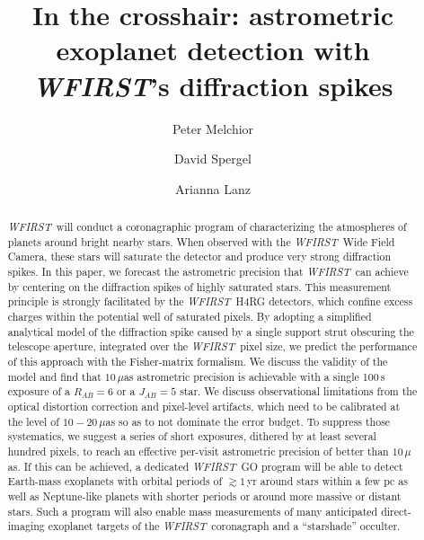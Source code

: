 \documentclass[modern, times]{aastex61}
\newcommand\wfirst{\textit{WFIRST}}
\begin{document}
\title{In the crosshair: astrometric exoplanet detection with \wfirst's diffraction spikes}


\author{Peter Melchior}

\author{David Spergel}

\author{Arianna Lanz}

\shorttitle{Astrometric exoplanet detection with \wfirst}

\begin{abstract}
\wfirst\ will conduct a coronagraphic program of characterizing the atmospheres of planets around bright nearby stars. 
When observed with the \wfirst\ Wide Field Camera, these stars will saturate the detector and produce very strong diffraction spikes. 
In this paper, we forecast the astrometric precision that \wfirst\ can achieve  by centering on the diffraction spikes of highly saturated stars.
This measurement principle is strongly facilitated by the \wfirst\ H4RG detectors, which confine excess charges within the potential well of saturated pixels.
By adopting a simplified analytical model of the diffraction spike caused by a single support strut obscuring the telescope aperture, integrated over the \wfirst\ pixel size, we predict the performance of this approach with the Fisher-matrix formalism. 
We discuss the validity of the model and find that $10\,\mu$as astrometric precision is achievable with a single 100\,s exposure of a $R_{AB}=6$ or a  $J_{AB}=5$ star.
We discuss observational limitations from the optical distortion correction and pixel-level artifacts, which need to be calibrated at the level of $10-20\,\mu$as so as to not dominate the error budget.
To suppress those systematics, we suggest a series of short exposures, dithered by at least several hundred pixels, to reach an effective per-visit astrometric precision of better than $10\,\mu$as.
If this can be achieved, a dedicated \wfirst\ GO program will be able to detect Earth-mass exoplanets with orbital periods of $\gtrsim1$\,yr around stars within a few pc as well as Neptune-like planets with shorter periods or around more massive or distant stars.
Such a program will also enable mass measurements of many anticipated direct-imaging exoplanet targets of the \wfirst\ coronagraph and a ``starshade'' occulter.
\end{abstract}
\end{document}
